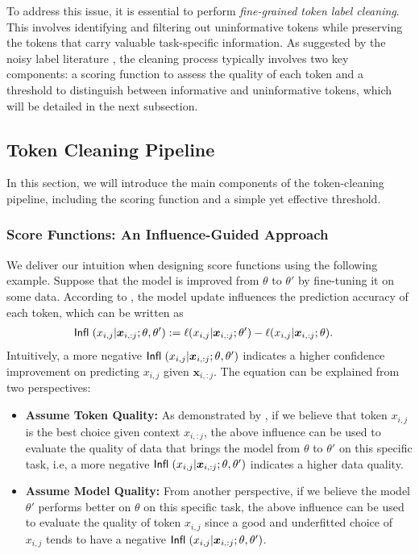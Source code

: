 To address this issue, it is essential to perform \textit{fine-grained token label cleaning}. This involves identifying and filtering out uninformative tokens while preserving the tokens that carry valuable task-specific information. As suggested by the noisy label literature \cite{zhu2022detecting,zhu2024unmasking}, the cleaning process typically involves two key components: a scoring function to assess the quality of each token and a threshold to distinguish between informative and uninformative tokens, which will be detailed in the next subsection.



\subsection{Token Cleaning Pipeline}

In this section, we will introduce the main components of the token-cleaning pipeline, including the scoring function and a simple yet effective threshold.

\subsubsection{Score Functions: An Influence-Guided Approach}\label{sec:score_func}

We deliver our intuition when designing score functions using the following example.
Suppose that the model is improved from $\theta$ to $\theta'$ by fine-tuning it on some data.
According to \citet{koh2017understanding,pang2024fairness}, the model update influences the prediction accuracy of each token, which can be written as 
\begin{equation}\label{eq:infl}
    \begin{aligned}
         & \textsf{Infl}_\textsf{\ }(x_{i,j}|\bm x_{i, :j}; \theta, \theta')
        := 
 \ell(x_{i,j} | \bm x_{i,:j}; \theta') - \ell(x_{i,j} | \bm x_{i,:j}; \theta).
    \end{aligned}
\end{equation}
Intuitively, a more negative $\textsf{Infl}_\textsf{\ }(x_{i,j}|\bm x_{i, :j}; \theta, \theta')$ indicates a higher confidence improvement on predicting $x_{i,j}$ given $\bm x_{i, :j}$. The equation can be explained from two perspectives:
\begin{itemize}[left=-3pt]
    \item \textbf{Assume Token Quality:} As demonstrated by \citet{pang2024fairness}, if we believe that token $x_{i,j}$ is the best choice given context $x_{i, :j}$, the above influence can be used to evaluate the quality of data that brings the model from $\theta$ to $\theta'$ on this specific task, i.e, a more negative $\textsf{Infl}_\textsf{\ }(x_{i,j}|\bm x_{i, :j}; \theta, \theta')$ indicates a higher data quality.
    \item \textbf{Assume Model Quality:} From another perspective, if we believe the model $\theta'$ performs better on $\theta$ on this specific task, the above influence can be used to evaluate the quality of token $x_{i,j}$ since a good and underfitted choice of $x_{i,j}$ tends to have a negative $\textsf{Infl}_\textsf{\ }(x_{i,j}|\bm x_{i, :j}; \theta, \theta')$. 
\end{itemize}


